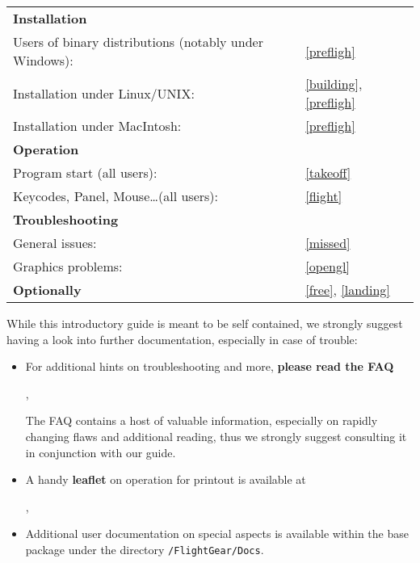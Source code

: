 \noindent
\begin{tabular}{ll}
 \textbf{Installation}                                  	&\\
 Users of binary distributions (notably under Windows):	 	& \ref{prefligh}\\
 Installation under Linux/UNIX:               				 		& \ref{building}, \ref{prefligh}\\
 Installation under MacIntosh:               							& \ref{prefligh}\\
  \textbf{Operation}                           						& \\
 Program start (all users):                      					& \ref{takeoff}\\
 Keycodes, Panel, Mouse\ldots (all users):       					& \ref{flight}\\
 \textbf{Troubleshooting}                      						& \\
 General issues:																						&  \ref{missed}\\
 Graphics problems: 									            				& \ref{opengl}\\
 \textbf{Optionally}                           						& \ref{free}, \ref{landing} 
\end{tabular}
\bigskip

\noindent
 While this introductory guide is meant to be self contained, we strongly suggest having a look into further documentation, especially in case of trouble:

\begin{itemize}
 \item For additional hints on troubleshooting and more, \textbf{please read the FAQ} 
 \medskip

 \noindent
 ,
 
 The FAQ contains a host of valuable information, especially on rapidly changing flaws and additional reading, thus we strongly suggest consulting it in conjunction with our guide.
 
 
 \item A handy \textbf{leaflet} on operation for printout is available at
 \medskip

 \noindent
 ,
 \item Additional user documentation on special aspects is available within the base package under the directory \texttt{/FlightGear/Docs}.
 \end{itemize}

